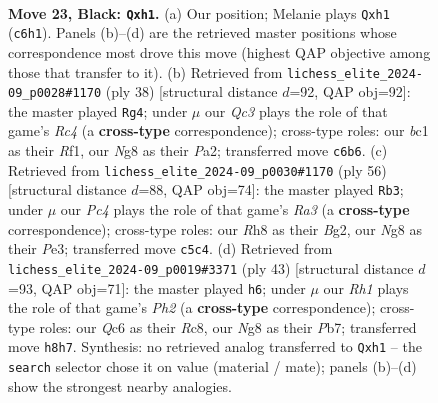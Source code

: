 \documentclass[11pt]{article}
\begin{document}
\clearpage

\begin{figure}[p]\centering
\begin{subfigure}{0.46\textwidth}\centering
\resizebox{\linewidth}{!}{%
\newchessgame
\chessboard[
  setfen={3k2nr/2r3p1/p1qb2Q1/2p3Pp/5P1P/2P5/PP3K2/RNB4R b - - 2 23},
  showmover=false,
  pgfstyle=straightmove, color=movearrow, markmove={c6-h1}
]}
\caption{}
\end{subfigure}\hfill
\begin{subfigure}{0.46\textwidth}\centering
\resizebox{\linewidth}{!}{%
\newchessgame
\chessboard[
  setfen={r1b2rk1/p2p2p1/1pnqp2p/5p2/2R5/3B1N2/PP4PP/3Q1R1K w - - 2 20},
  showmover=false,
  pgfstyle=straightmove, color=movearrow, markmove={c4-g4}
]}
\caption{}
\end{subfigure}
\\[4pt]
\begin{subfigure}{0.46\textwidth}\centering
\resizebox{\linewidth}{!}{%
\newchessgame
\chessboard[
  setfen={3r2k1/1p2rpp1/2qN2bp/2Ppn3/8/R1Q1PPP1/6BP/2R3K1 w - - 7 29},
  showmover=false,
  pgfstyle=straightmove, color=movearrow, markmove={a3-b3}
]}
\caption{}
\end{subfigure}\hfill
\begin{subfigure}{0.46\textwidth}\centering
\resizebox{\linewidth}{!}{%
\newchessgame
\chessboard[
  setfen={2rr2k1/1pb1qppp/p7/3pP3/3B3P/1P3QP1/P4P2/2R1R1K1 b - - 0 22},
  showmover=false,
  pgfstyle=straightmove, color=movearrow, markmove={h7-h6}
]}
\caption{}
\end{subfigure}
\caption{\textbf{Move 23, Black: \texttt{Qxh1}.} (a) Our position; Melanie plays \texttt{Qxh1} (\texttt{c6h1}). Panels (b)--(d) are the retrieved master positions whose correspondence most drove this move (highest QAP objective among those that transfer to it). (b) Retrieved from \texttt{lichess\_elite\_2024-09\_p0028\#1170} (ply 38) [structural distance $d$=92, QAP obj=92]: the master played \texttt{Rg4}; under $\mu$ our \emph{Qc3} plays the role of that game's \emph{Rc4} (a \textbf{cross-type} correspondence); cross-type roles: our \emph{b}c1 as their \emph{R}f1, our \emph{N}g8 as their \emph{P}a2; transferred move \texttt{c6b6}. (c) Retrieved from \texttt{lichess\_elite\_2024-09\_p0030\#1170} (ply 56) [structural distance $d$=88, QAP obj=74]: the master played \texttt{Rb3}; under $\mu$ our \emph{Pc4} plays the role of that game's \emph{Ra3} (a \textbf{cross-type} correspondence); cross-type roles: our \emph{R}h8 as their \emph{B}g2, our \emph{N}g8 as their \emph{P}e3; transferred move \texttt{c5c4}. (d) Retrieved from \texttt{lichess\_elite\_2024-09\_p0019\#3371} (ply 43) [structural distance $d$=93, QAP obj=71]: the master played \texttt{h6}; under $\mu$ our \emph{Rh1} plays the role of that game's \emph{Ph2} (a \textbf{cross-type} correspondence); cross-type roles: our \emph{Q}c6 as their \emph{R}c8, our \emph{N}g8 as their \emph{P}b7; transferred move \texttt{h8h7}. Synthesis: no retrieved analog transferred to \texttt{Qxh1} -- the \texttt{search} selector chose it on value (material / mate); panels (b)--(d) show the strongest nearby analogies.}
\label{fig:thought-m45}
\end{figure}
\end{document}
